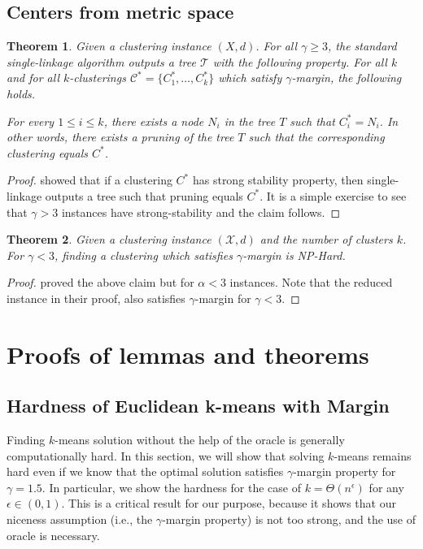 \documentclass{article}
\newcommand{\mc}{\mathcal}
\newtheorem{theorem}{Theorem}
\begin{document}
\subsection{Centers from metric space}
\begin{theorem}
\label{thm:upperCenterMetric}
Given a clustering instance $(X , d)$. For all $\gamma \ge 3$, the standard single-linkage algorithm outputs a tree $\mc T$ with the following property. For all $k$ and for all $k$-clusterings $\mc C^* = \{C_1^*, \ldots, C_k^* \}$ which satisfy $\gamma$-margin, the following holds.

For every $1 \le i \le k$, there exists a node $N_i$ in the tree $T$ such that $C_i^* = N_i$. In other words, there exists a pruning of the tree $T$ such that the corresponding clustering equals $C^*$. 
\end{theorem}

\begin{proof}
\cite{balcan2008discriminative} showed that if a clustering $C^*$ has strong stability property, then single-linkage outputs a tree such that pruning equals $C^*$. It is a simple exercise to see that $\gamma > 3$ instances have strong-stability and the claim follows.  
\end{proof}


\begin{theorem}
\label{thm:lowerCenterMetric}
Given a clustering instance $(\mc X, d)$ and the number of clusters $k$. For $\gamma < 3$, finding a clustering which satisfies $\gamma$-margin is NP-Hard.
\end{theorem}
\begin{proof}
\cite{awasthi2012center} proved the above claim but for $\alpha < 3$ instances. Note that the reduced instance in their proof, also satisfies $\gamma$-margin for $\gamma < 3$. 
\end{proof}


\section{Proofs of lemmas and theorems}
\label{appendix:hardnessthms}
\subsection{Hardness of Euclidean k-means with Margin}

Finding $k$-means solution without the help of the oracle is generally computationally hard. In this section, we will show that solving $k$-means remains hard even if we know that the optimal solution satisfies $\gamma$-margin property for $\gamma=1.5$. In particular, we show the hardness for the case of $k=\Theta(n^\epsilon)$ for any $\epsilon\in (0,1)$. This is a critical result for our purpose, because it shows that our niceness assumption (i.e., the $\gamma$-margin property) is not too strong, and the use of oracle is necessary.
\end{document}

